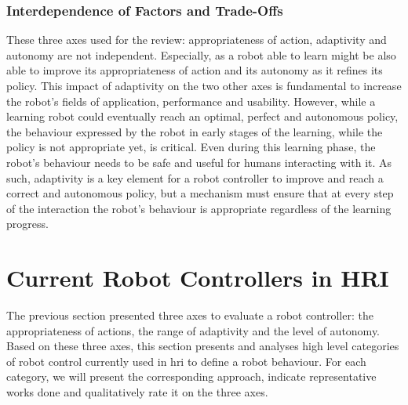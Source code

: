 
\subsubsection{Interdependence of Factors and Trade-Offs}

	These three axes used for the review: appropriateness of action, adaptivity and autonomy are not independent. Especially, as a robot able to learn might be also able to improve its appropriateness of action and its autonomy as it refines its policy. This impact of adaptivity on the two other axes is fundamental to increase the robot's fields of application, performance and usability. However, while a learning robot could eventually reach an optimal, perfect and autonomous policy, the behaviour expressed by the robot in early stages of the learning, while the policy is not appropriate yet, is critical. Even during this learning phase, the robot's behaviour needs to be safe and useful for humans interacting with it. As such, adaptivity is a key element for a robot controller to improve and reach a correct and autonomous policy, but a mechanism must ensure that at every step of the interaction the robot's behaviour is appropriate regardless of the learning progress.

\section{Current Robot Controllers in HRI} \label{sec:back_behaviour}

    The previous section presented three axes to evaluate a robot controller: the appropriateness of actions, the range of adaptivity and the level of autonomy. Based on these three axes, this section presents and analyses high level categories of robot control currently used in \gls{hri} to define a robot behaviour. 
    For each category, we will present the corresponding approach, indicate representative works done and qualitatively rate it on the three axes.
	
